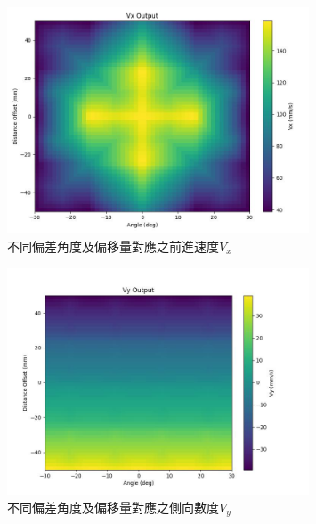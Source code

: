 \documentclass[12pt]{article}       %
\begin{document}
\begin{figure}[H]
    \centering
    \includegraphics[width=0.8\textwidth]{25.jpg}     %
    \caption{不同偏差角度及偏移量對應之前進速度$V_{x}$}    %
    \label{fig:25}    %
\end{figure}

\begin{figure}[H]
    \centering
    \includegraphics[width=0.8\textwidth]{26.jpg}     %
    \caption{不同偏差角度及偏移量對應之側向數度$V_{y}$}    %
    \label{fig:26}    %
\end{figure}
\end{document}
